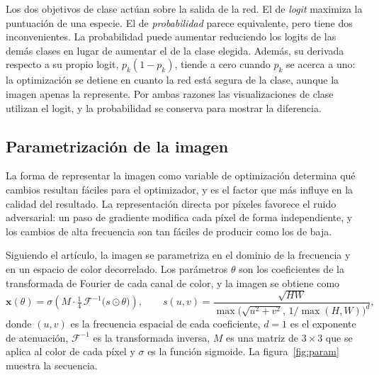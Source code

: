 \documentclass[11pt,a4paper]{article}
\newcommand{\vx}{\mathbf{x}}
\begin{document}
Los dos objetivos de clase actúan sobre la salida de la red. El de
\emph{logit} maximiza la puntuación de una especie. El de
\emph{probabilidad} parece equivalente, pero tiene dos inconvenientes. La
probabilidad puede aumentar reduciendo los logits de las demás clases en
lugar de aumentar el de la clase elegida. Además, su derivada respecto a su
propio logit, $p_k(1-p_k)$, tiende a cero cuando $p_k$ se acerca a uno: la
optimización se detiene en cuanto la red está segura de la clase, aunque la
imagen apenas la represente. Por ambas razones las visualizaciones de clase
utilizan el logit, y la probabilidad se conserva para mostrar la diferencia.

\subsection{Parametrización de la imagen}
\label{sec:param}

La forma de representar la imagen como variable de optimización determina
qué cambios resultan fáciles para el optimizador, y es el factor que más
influye en la calidad del resultado. La representación directa por
píxeles favorece el ruido adversarial: un paso de gradiente modifica cada
píxel de forma independiente, y los cambios de alta frecuencia son tan
fáciles de producir como los de baja.

Siguiendo el artículo, la imagen se parametriza en el dominio de la
frecuencia y en un espacio de color decorrelado. Los parámetros $\theta$ son
los coeficientes de la transformada de Fourier de cada canal de color, y la
imagen se obtiene como
\begin{equation}
\vx(\theta) = \sigma\!\left( M \cdot \tfrac{1}{4}\,\mathcal{F}^{-1}\!\bigl(s \odot \theta\bigr) \right),
\qquad
s(u,v) = \frac{\sqrt{HW}}{\max\bigl(\sqrt{u^2+v^2},\, 1/\max(H,W)\bigr)^{d}},
\label{eq:fourier}
\end{equation}
donde $(u,v)$ es la frecuencia espacial de cada coeficiente, $d = 1$ es el
exponente de atenuación, $\mathcal{F}^{-1}$ es la transformada inversa, $M$
es una matriz de $3 \times 3$ que se aplica al color de cada píxel y
$\sigma$ es la función sigmoide. La figura~\ref{fig:param} muestra la
secuencia.
\end{document}
